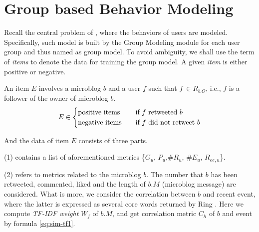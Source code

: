 \section{Group based Behavior Modeling}
\label{sec:gm}



\par Recall the central problem of \sys{}, where the \retg{} behaviors of users are modeled.
Specifically, such model is built by the Group Modeling module for each user group and thus named as group model.
To avoid ambiguity, we shall use the term of \textit{items} to denote the data for training the group model.
A given \textit{item} is either positive or negative.

\begin{definition}
\label{def:gm-it}
An item $E$ involves a microblog $b$ and a user $f$ such that $f\ \in R_{b.O}$, i.e., $f$ is a follower of  the owner of microblog $b$.
\begin{equation}
\label{eq:gm-it}
E \in
  \begin{cases}
    \text{positive items}       & \quad \text{if } f \text{ retweeted{} } b\\
    \text{negative items}  		& \quad \text{if } f \text{ did not retweet{} } b
  \end{cases}
\end{equation}
\end{definition}

And the data of item $E$ consists of three parts.

	\stab(1)  contains a list of aforementioned metrics \{$G_u$, $P_u$,\#$R_u$, \#$E_u$, $R_{ee,u}$\}.
	

\stab(2)  refers to metrics related to the microblog $b$.
The number that $b$ has been retweeted, commented, liked and the length of $b.M$ (microblog message) are considered.
What is more, we consider the correlation between $b$ and recent event, where the latter is expressed as several core words returned by Ring \cite{IEEEexample:ring}.
Here we compute \textit{TF-IDF weight} $W_f$ of $b.M$, and get correlation metric $C_h$ of $b$ and event by formula \ref{eq:sim-tf1}.

